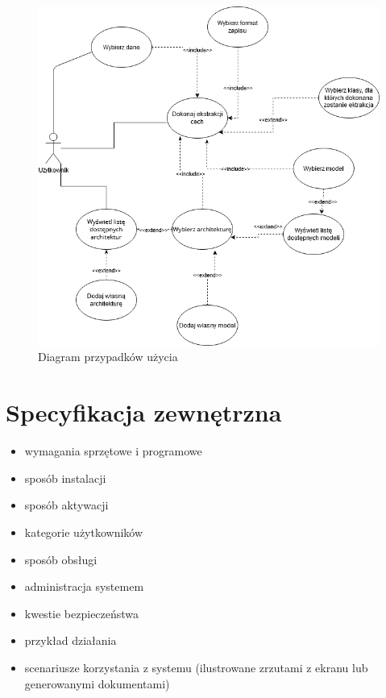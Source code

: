 \documentclass[a4paper,twoside,12pt]{book}
\begin{document}
{{{\begin{figure}[h!]
\centering
\includegraphics[scale=0.4]{usecase.png}
\caption{Diagram przypadków użycia}
\label{usecase}
\end{figure}

}










\chapter{Specyfikacja zewnętrzna}
\begin{itemize}
\item  wymagania sprzętowe i programowe
\item  sposób instalacji
\item  sposób aktywacji
\item  kategorie użytkowników
\item  sposób obsługi
\item   administracja systemem
\item  kwestie bezpieczeństwa
\item  przykład działania
\item  scenariusze korzystania z systemu (ilustrowane zrzutami z ekranu lub generowanymi dokumentami)
\end{itemize}
 


}}
\end{document}
